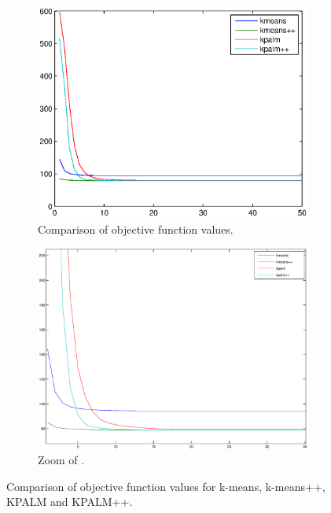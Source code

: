 
\begin{figure}[ht]
    \centering
    \begin{subfigure}[b]{0.8\textwidth}
        \includegraphics[width=\textwidth]{psi_algs_comparison2}
        \caption{Comparison of objective function values.}
        \label{fig:algs_psi_comp_A}
    \end{subfigure}
    \begin{subfigure}[b]{0.8\textwidth}
        \includegraphics[width=\textwidth]{psi_algs_comparison2_zoom}
        \caption{Zoom of .}
        \label{fig:algs_psi_comp_B}
    \end{subfigure}
    \caption{Comparison of objective function values for k-means, k-means++, KPALM and KPALM++.} \label{fig:algs_psi_comp}
\end{figure}

